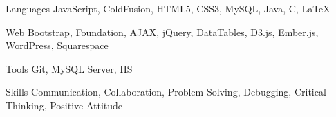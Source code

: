 

\begin{cvskills}

  \cvskill
    {Languages} %
    {JavaScript, ColdFusion, HTML5, CSS3, MySQL, Java, C, LaTeX} %

  \cvskill
    {Web} %
    {Bootstrap, Foundation, AJAX, jQuery, DataTables, D3.js, Ember.js, WordPress, Squarespace} %

  \cvskill
    {Tools} %
    {Git, MySQL Server, IIS} %

  \cvskill
    {Skills} %
    {Communication, Collaboration, Problem Solving, Debugging, Critical Thinking, Positive Attitude} %

\end{cvskills}
